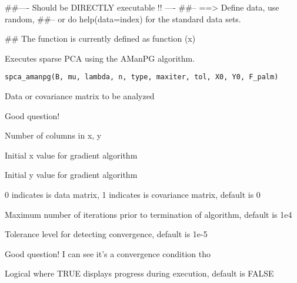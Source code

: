 \documentclass[a4paper]{book}
\begin{document}
%
\begin{Arguments}
\begin{ldescription}
\item[\code{x}] 


\end{ldescription}
\end{Arguments}
%
\begin{Examples}
\begin{ExampleCode}
##---- Should be DIRECTLY executable !! ----
##-- ==>  Define data, use random,
##--	or do  help(data=index)  for the standard data sets.

## The function is currently defined as
function (x)
{
  }
\end{ExampleCode}
\end{Examples}
%
\begin{Description}\relax

Executes sparse PCA using the AManPG algorithm.
\end{Description}
%
\begin{Usage}
\begin{verbatim}
spca_amanpg(B, mu, lambda, n, type, maxiter, tol, X0, Y0, F_palm)
\end{verbatim}
\end{Usage}
%
\begin{Arguments}
\begin{ldescription}
\item[\code{b}] Data or covariance matrix to be analyzed
\item[\code{mu}] Good question!
\item[\code{n}] Number of columns in x, y
\item[\code{x0}] Initial x value for gradient algorithm
\item[\code{y0}] Initial y value for gradient algorithm
\item[\code{type}] 
0 indicates  is data matrix, 1 indicates  is covariance matrix, default is 0

\item[\code{maxiter}] Maximum number of iterations prior to termination of algorithm, default is 1e4
\item[\code{tol}] Tolerance level for detecting convergence, default is 1e-5
\item[\code{f\_palm}] Good question! I can see it's a convergence condition tho
\item[\code{verbose}] Logical where TRUE displays progress during execution, default is FALSE
\end{ldescription}
\end{Arguments}
\end{document}
